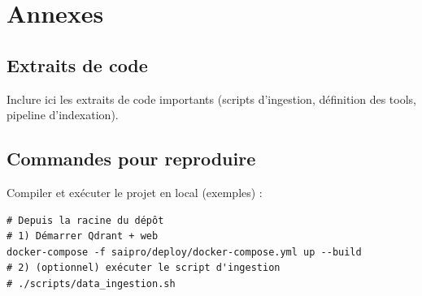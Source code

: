 \documentclass[12pt,a4paper]{report}
\begin{document}
\chapter{Annexes}
\section{Extraits de code}
Inclure ici les extraits de code importants (scripts d'ingestion, définition des tools, pipeline d'indexation).

\section{Commandes pour reproduire}
Compiler et exécuter le projet en local (exemples) :
\begin{verbatim}
# Depuis la racine du dépôt
# 1) Démarrer Qdrant + web
docker-compose -f saipro/deploy/docker-compose.yml up --build
# 2) (optionnel) exécuter le script d'ingestion
# ./scripts/data_ingestion.sh
\end{verbatim}
\end{document}
